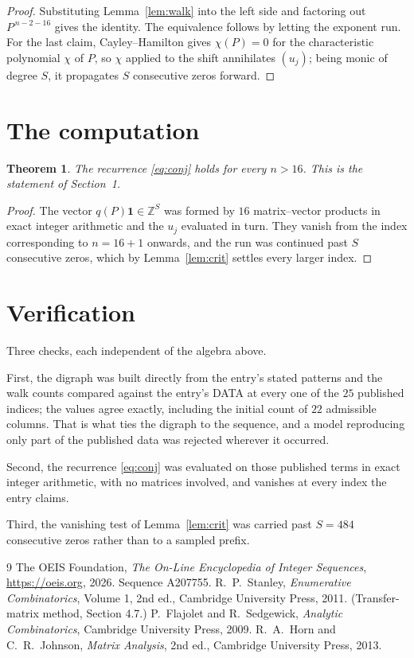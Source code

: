 \documentclass[11pt,a4paper]{article}
\theoremstyle{plain}
\newtheorem{theorem}{Theorem}
\theoremstyle{definition}
\begin{document}
\begin{proof}
Substituting Lemma~\ref{lem:walk} into the left side and factoring out
$P^{\,n-2-16}$ gives the identity. The equivalence follows by letting the exponent
run. For the last claim, Cayley--Hamilton gives $\chi(P)=0$ for the characteristic
polynomial $\chi$ of $P$, so $\chi$ applied to the shift annihilates $(u_j)$; being monic of
degree $S$, it propagates $S$ consecutive zeros forward.
\end{proof}

\section{The computation}

\begin{theorem}
The recurrence \eqref{eq:conj} holds for every $n>16$. This is the statement of
Section~1.
\end{theorem}

\begin{proof}
The vector $q(P)\mathbf{1}\in\mathbb{Z}^{S}$ was formed by $16$ matrix--vector
products in exact integer arithmetic and the $u_j$ evaluated in turn. They vanish from the
index corresponding to $n=16+1$ onwards, and the run was continued past $S$ consecutive
zeros, which by Lemma~\ref{lem:crit} settles every larger index.
\end{proof}

\section{Verification}

Three checks, each independent of the algebra above.

First, the digraph was built directly from the entry's stated patterns and the walk counts
compared against the entry's DATA at every one of the $25$ published indices; the
values agree exactly, including the initial count of $22$ admissible columns. That is
what ties the digraph to the sequence, and a model reproducing only part of the published
data was rejected wherever it occurred.

Second, the recurrence \eqref{eq:conj} was evaluated on those published terms in exact
integer arithmetic, with no matrices involved, and vanishes at every index the entry claims.

Third, the vanishing test of Lemma~\ref{lem:crit} was carried past $S=484$ consecutive
zeros rather than to a sampled prefix.

\begin{thebibliography}{9}
 The OEIS Foundation, \emph{The On-Line Encyclopedia of Integer
Sequences}, \url{https://oeis.org}, 2026. Sequence A207755.
 R.~P.~Stanley, \emph{Enumerative Combinatorics}, Volume 1, 2nd ed.,
Cambridge University Press, 2011. (Transfer-matrix method, Section 4.7.)
 P.~Flajolet and R.~Sedgewick, \emph{Analytic Combinatorics}, Cambridge
University Press, 2009.
 R.~A.~Horn and C.~R.~Johnson, \emph{Matrix Analysis}, 2nd ed., Cambridge
University Press, 2013.
\end{thebibliography}
\end{document}

